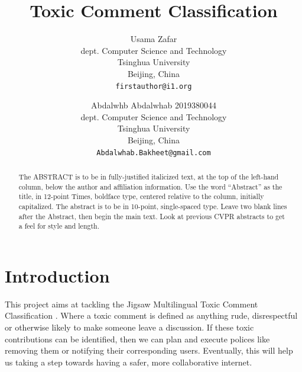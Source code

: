 \documentclass[10pt,twocolumn,letterpaper]{article}
\begin{document}
\title{ Toxic Comment Classification }

\author{Usama Zafar\\
dept. Computer Science and Technology\\
Tsinghua University \\
Beijing, China\\
{\tt\small firstauthor@i1.org}
\and
Abdalwhb Abdalwhab 2019380044\\
dept. Computer Science and Technology\\
Tsinghua University \\
Beijing, China\\
{\tt\small Abdalwhab.Bakheet@gmail.com}
}

\maketitle

\begin{abstract}
   The ABSTRACT is to be in fully-justified italicized text, at the top
   of the left-hand column, below the author and affiliation
   information. Use the word ``Abstract'' as the title, in 12-point
   Times, boldface type, centered relative to the column, initially
   capitalized. The abstract is to be in 10-point, single-spaced type.
   Leave two blank lines after the Abstract, then begin the main text.
   Look at previous CVPR abstracts to get a feel for style and length.
\end{abstract}

\section{Introduction}

This project aims at tackling the Jigsaw Multilingual Toxic Comment Classification \cite{Jigsaw}. Where a toxic comment is defined as anything rude, disrespectful or otherwise likely to make someone leave a discussion. If these toxic contributions can be identified, then we can plan and execute polices like removing them or notifying their corresponding users. Eventually, this will help us taking a step towards having a safer, more collaborative internet. 
\end{document}
